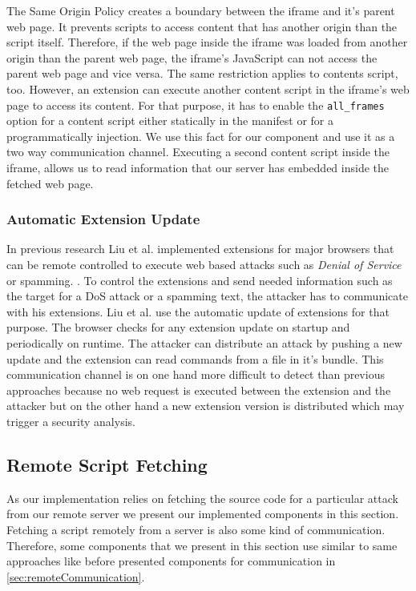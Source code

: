 	The Same Origin Policy creates a boundary between the iframe and it's parent web page. It prevents scripts to access content that has another origin than the script itself. Therefore, if the web page inside the iframe was loaded from another origin than the parent web page, the iframe's JavaScript can not access the parent web page and vice versa. The same restriction applies to contents script, too. However, an extension can execute another content script in the iframe's web page to access its content. For that purpose, it has to enable the \texttt{all\_frames} option for a content script either statically in the manifest or for a programmatically injection. We use this fact for our component and use it as a two way communication channel. Executing a second content script inside the iframe, allows us to read information that our server has embedded inside the fetched web page.

\subsubsection{Automatic Extension Update}
\label{sec:automaticExtensionUpdate}

	In previous research Liu et al. implemented extensions for major browsers that can be remote controlled to execute web based attacks such as \textit{Denial of Service} or spamming. \cite{liu2011botnet, Liu12chromeextensions:}. To control the extensions and send needed information such as the target for a DoS attack or a spamming text, the attacker has to communicate with his extensions. Liu et al. use the automatic update of extensions for that purpose. The browser checks for any extension update on startup and periodically on runtime. The attacker can distribute an attack by pushing a new update and the extension can read commands from a file in it's bundle. This communication channel is on one hand more difficult to detect than previous approaches because no web request is executed between the extension and the attacker but on the other hand a new extension version is distributed which may trigger a security analysis. 

\subsection{Remote Script Fetching}
	
	As our implementation relies on fetching the source code for a particular attack from our remote server we present our implemented components in this section. Fetching a script remotely from a server is also some kind of communication. Therefore, some components that we present in this section use similar to same approaches like before presented components for communication in \autoref{sec:remoteCommunication}. 
	
